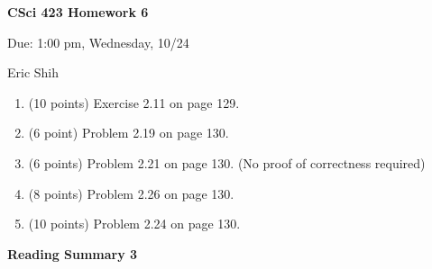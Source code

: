\documentclass[11pt]{article}
\begin{document}
\begin{LARGE}
\centerline {\bf CSci 423 Homework 6}
\end{LARGE}
\vskip 0.25cm

\centerline{Due: 1:00 pm, Wednesday, 10/24}
\centerline{Eric Shih}

\begin{enumerate}
  \item (10 points) Exercise 2.11 on page 129.
  \item (6 point) Problem 2.19 on page 130.
  \item (6 points) Problem 2.21 on page 130. (No proof of correctness required)
  \item (8 points) Problem 2.26 on page 130.
  \item (10 points) Problem 2.24 on page 130. 
\end{enumerate}

\pagebreak
\setlength{\parindent}{1cm}
\centerline{\bf Reading Summary 3}

\begin{spacing}{1.5}
 
\end{spacing}
\end{document}
